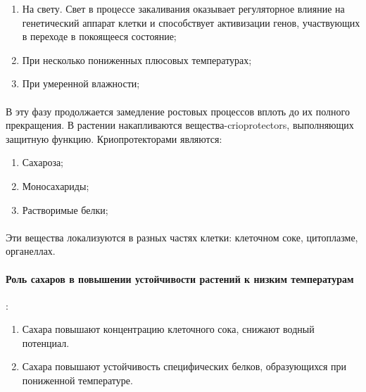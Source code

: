 \begin{enumerate}
	\item На свету. Свет в процессе закаливания оказывает регуляторное влияние на генетический аппарат клетки и способствует активизации генов, участвующих в переходе в покоящееся состояние;
	\item При несколько пониженных плюсовых температурах; 
	\item При умеренной влажности; 
\end{enumerate}

\paragraph*{}В эту фазу продолжается замедление ростовых процессов вплоть до их полного прекращения. В растении накапливаются вещества-\gls{crioprotectors}, выполняющих защитную функцию. Криопротекторами являются:

\begin{enumerate}
	\item Сахароза;
	\item Моносахариды;
	\item Растворимые белки;
\end{enumerate}

\paragraph*{}Эти вещества локализуются в разных частях клетки: клеточном соке, цитоплазме, органеллах. 

\paragraph*{Роль сахаров в повышении устойчивости растений к низким температурам}: 

\begin{enumerate}
	\item Сахара повышают концентрацию клеточного сока, снижают водный потенциал. 
	\item Сахара повышают устойчивость специфических белков, образующихся при пониженной температуре. 
\end{enumerate}

